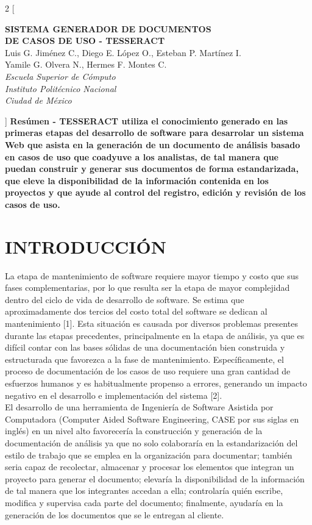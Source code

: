 \documentclass{article}
\begin{document}
	\begin{multicols}{2}
		[
		\begin{center}
			\Large \textbf {SISTEMA GENERADOR DE DOCUMENTOS \\ DE CASOS DE USO - TESSERACT}\\
			\small Luis G. Jiménez C., Diego E. López O., Esteban P. Martínez I.\\
			\small Yamile G. Olvera N., Hermes F. Montes C.\\
			\small \textit{Escuela Superior de Cómputo \\ Instituto Politécnico Nacional}\\
			\small \textit{Ciudad de México}\\
		\end{center}
		]
	\textbf {Resúmen - TESSERACT utiliza el conocimiento generado en las primeras etapas del desarrollo de software para desarrolar un sistema Web que asista en la generación de un documento de análisis basado en casos de uso que coadyuve a los analistas, de tal manera que puedan construir y generar sus documentos de forma estandarizada, que eleve la disponibilidad de la información contenida en los proyectos y que ayude al control del registro, edición y revisión de los casos de uso. }
	
	\section{INTRODUCCIÓN}
	La etapa de mantenimiento de software requiere mayor tiempo y costo que sus fases complementarias, por lo que resulta ser la etapa de mayor complejidad dentro del ciclo de vida de desarrollo de software. Se estima que aproximadamente dos tercios del costo total del software se dedican al mantenimiento [1]. Esta situación es causada por diversos problemas presentes durante las etapas precedentes, principalmente en la etapa de análisis, ya que es difícil contar con las bases sólidas de una documentación bien construida y estructurada que favorezca a la fase de mantenimiento. Específicamente, el proceso de documentación de los casos de uso requiere una gran cantidad de esfuerzos humanos y es habitualmente propenso a errores, generando un impacto negativo en el desarrollo e implementación del sistema [2]. \\
	
	El desarrollo de una herramienta de Ingeniería de Software Asistida por Computadora (Computer Aided Software Engineering, CASE por sus siglas en inglés) en un nivel alto  favorecería la construcción y generación de la documentación de análisis ya que no solo colaboraría en la estandarización del estilo de trabajo que se emplea en la organización para documentar; también seria capaz de recolectar, almacenar y procesar los elementos que integran un proyecto para generar el documento; elevaría la disponibilidad de la información de tal manera que los integrantes accedan a ella; controlaría quién escribe, modifica y supervisa cada parte del documento; finalmente, ayudaría en la generación de los documentos que se le entregan al cliente.
	

\end{multicols}
\end{document}
